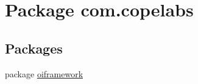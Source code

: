 \hypertarget{namespacecom_1_1copelabs}{}\section{Package com.\+copelabs}
\label{namespacecom_1_1copelabs}
\subsection*{Packages}
\begin{DoxyCompactItemize}
\item 
package \hyperlink{namespacecom_1_1copelabs_1_1oiframework}{oiframework}
\end{DoxyCompactItemize}
